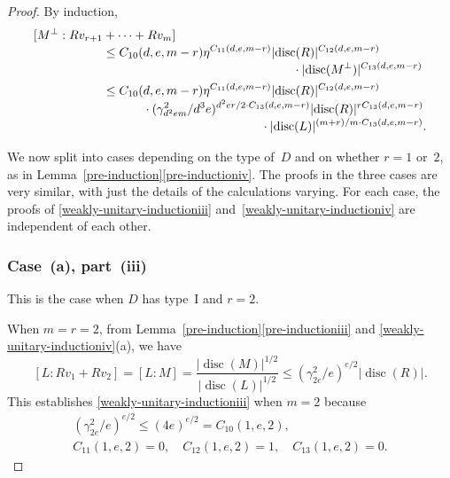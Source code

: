 \documentclass[JEP,XML,SOM,Unicode,NoFloatCountersInSection]{cedram}
\DeclareMathOperator{\disc}{disc}
\newcommand{\abs}[1]{\lvert #1 \rvert}
\begin{document}
\begin{proof}
By induction,\vspace*{-3pt}
\begin{equation}\label{eqn:Mperp-index}
\begin{aligned}{}
[M^\perp:Rv_{r+1} &+ \dotsb + Rv_m]\\[-3pt]
&\leq C_{10}(d,e,m-r) \eta^{C_{11}(d,e,m-r)} \abs{\disc(R)}^{C_{12}(d,e,m-r)}\\[-3pt]
&\hspace*{5.4cm}\cdot\abs{\disc(M^\perp)}^{C_{13}(d,e,m-r)}
\\
& \leq C_{10}(d,e,m-r) \eta^{C_{11}(d,e,m-r)} \abs{\disc(R)}^{C_{12}(d,e,m-r)}\\[-3pt]
&\hspace*{1.15cm}\cdot(\gamma_{d^2em}^2/d^3e)^{d^2er/2 \cdot C_{13}(d,e,m-r)}\abs{\disc(R)}^{rC_{13}(d,e,m-r)}\\[-3pt]
&\hspace*{4.5cm}\cdot \abs{\disc(L)}^{(m+r)/m \cdot C_{13}(d,e,m-r)}.
\end{aligned}
\end{equation}

We now split into cases depending on the type of~$D$ and on whether $r = 1$ or~$2$, as in Lemma~\ref{pre-induction}\eqref{pre-inductioniv}.
The proofs in the three cases are very similar, with just the details of the calculations varying.
For each case, the proofs of \eqref{weakly-unitary-inductioniii} and~\eqref{weakly-unitary-inductioniv} are independent of each other.

\subsubsection*{Case~(a), part~(iii)}
This is the case when $D$ has type~I and $r=2$.
\par\nopagebreak
When $m=r=2$, from Lemma~\ref{pre-induction}\eqref{pre-inductioniii} and \eqref{weakly-unitary-inductioniv}(a), we have\vspace*{-3pt}
\[
[L:Rv_1 + Rv_2] = [L:M] = \frac{\abs{\disc(M)}^{1/2}}{\abs{\disc(L)}^{1/2}}
\leq (\gamma_{2e}^2/e)^{e/2} \abs{\disc(R)}.
\]
This establishes \eqref{weakly-unitary-inductioniii} when $m=2$ because
\begin{gather*}
(\gamma_{2e}^2/e)^{e/2} \leq (4e)^{e/2} = C_{10}(1,e,2),
\\ C_{11}(1,e,2) = 0,
\quad C_{12}(1,e,2) = 1,
\quad C_{13}(1,e,2) = 0.
\end{gather*}


\end{proof}
\end{document}
